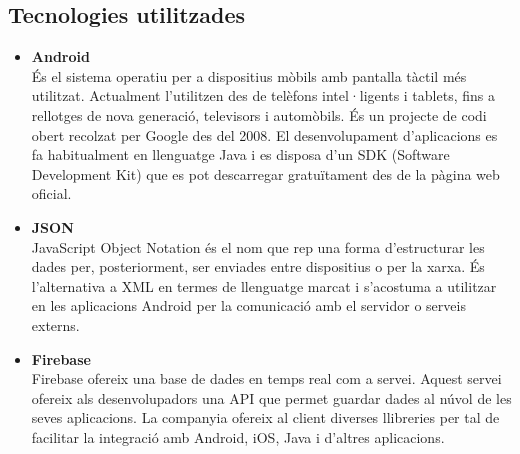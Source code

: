 \subsection{Tecnologies utilitzades}
\begin{itemize}
\item[]{\textbf{Android}}\\
És el sistema operatiu per a dispositius mòbils amb pantalla tàctil més utilitzat. Actualment l'utilitzen des de telèfons intel·ligents i tablets, fins a rellotges de nova generació, televisors i automòbils. És un projecte de codi obert recolzat per Google des del 2008. El desenvolupament d'aplicacions es fa habitualment en llenguatge Java i es disposa d'un SDK (Software Development Kit) que es pot descarregar gratuïtament des de la pàgina web oficial.\\

\item[]{\textbf{JSON}}\\
JavaScript Object Notation és el nom que rep una forma d'estructurar les dades per, posteriorment, ser enviades entre dispositius o per la xarxa. És l'alternativa a XML en termes de llenguatge marcat i s'acostuma a utilitzar en les aplicacions Android per la comunicació amb el servidor o serveis externs.\\

\item[]{\textbf{Firebase}}\\
Firebase ofereix una base de dades en temps real com a servei. Aquest servei ofereix als desenvolupadors una API que permet guardar dades al núvol de les seves aplicacions. La companyia ofereix al client diverses llibreries per tal de facilitar la integració amb Android, iOS, Java i d'altres aplicacions.

\end{itemize}

